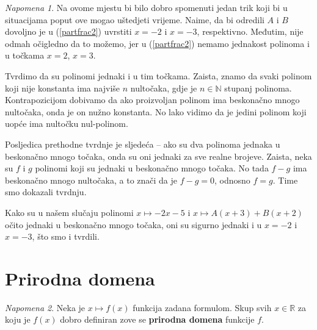 \documentclass{book}
\theoremstyle{definition}
\theoremstyle{definition}
\theoremstyle{remark}
\newtheorem{remark}{Napomena}
\begin{document}
\begin{remark}
Na ovome mjestu bi bilo dobro spomenuti jedan trik koji bi u situacijama poput ove mogao uštedjeti vrijeme. Naime, da bi odredili $A$ i $B$ dovoljno je u (\ref{partfrac2}) uvrstiti $x=-2$ i $x=-3$, respektivno. Međutim, nije odmah očigledno da to možemo, jer u (\ref{partfrac2}) nemamo jednakost polinoma i u točkama $x=2$, $x=3$. 

Tvrdimo da su polinomi jednaki i u tim točkama. Zaista, znamo da svaki polinom koji nije konstanta ima najviše $n$ nultočaka, gdje je $n\in \mathbb{N}$ stupanj polinoma. Kontrapozicijom dobivamo da ako proizvoljan polinom ima beskonačno mnogo nultočaka, onda je on nužno konstanta. No lako vidimo da je jedini polinom koji uopće ima nultočku nul-polinom. 

Posljedica prethodne tvrdnje je sljedeća -- ako su dva polinoma jednaka u beskonačno mnogo točaka, onda su oni jednaki za sve realne brojeve. Zaista, neka su $f$ i $g$ polinomi koji su jednaki u beskonačno mnogo točaka. No tada $f-g$ ima beskonačno mnogo nultočaka, a to znači da je $f-g=0$, odnosno $f=g$. Time smo dokazali tvrdnju. 

Kako su u našem slučaju polinomi $x\mapsto -2x-5$ i $x\mapsto A(x+3)+B(x+2)$ očito jednaki u beskonačno mnogo točaka, oni su sigurno jednaki i u $x=-2$ i $x=-3$, što smo i tvrdili.
\end{remark}
\section{Prirodna domena}
\begin{remark}
Neka je $x\mapsto f(x)$ funkcija zadana formulom. Skup svih $x\in \mathbb{R}$ za koju je $f(x)$ dobro definiran zove se \textbf{prirodna domena} funkcije $f$.
\end{remark}
\end{document}
